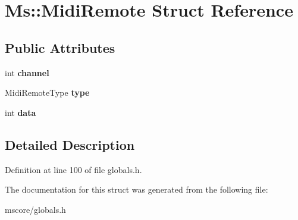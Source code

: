 \hypertarget{struct_ms_1_1_midi_remote}{}\section{Ms\+:\+:Midi\+Remote Struct Reference}
\label{struct_ms_1_1_midi_remote}
\subsection*{Public Attributes}
\begin{DoxyCompactItemize}
\item 
\mbox{\label{struct_ms_1_1_midi_remote_a7ad617fec775a408d5d1522e3cd7e66e}} 
int {\bfseries channel}
\item 
\mbox{\label{struct_ms_1_1_midi_remote_ae5cd7d97f36abca0e6d767efe64b4eb1}} 
Midi\+Remote\+Type {\bfseries type}
\item 
\mbox{\label{struct_ms_1_1_midi_remote_a25be969ffce52f1ac92527851d2d3dba}} 
int {\bfseries data}
\end{DoxyCompactItemize}


\subsection{Detailed Description}


Definition at line 100 of file globals.\+h.



The documentation for this struct was generated from the following file\+:\begin{DoxyCompactItemize}
\item 
mscore/globals.\+h\end{DoxyCompactItemize}
